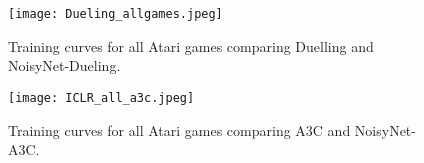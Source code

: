 \documentclass{article}
\newcommand{\algoinit}{NoisyNet}
\begin{document}
\newpage

\begin{figure}[!ht]
\begin{centering}
    \texttt{[image: Dueling\_allgames.jpeg]}
    \caption{Training curves for all Atari games comparing Duelling and \algoinit{}-Dueling.}
    \label{fig:all_games_Dueling}    
    \end{centering}
\end{figure}

\newpage

\begin{figure}[!htp]
\begin{centering}
    \texttt{[image: ICLR\_all\_a3c.jpeg]}
    \caption{Training curves for all Atari games comparing A3C and \algoinit{}-A3C.}
    \label{fig:all_games_a3c}    
    \end{centering}
\end{figure}


 
\end{document}
